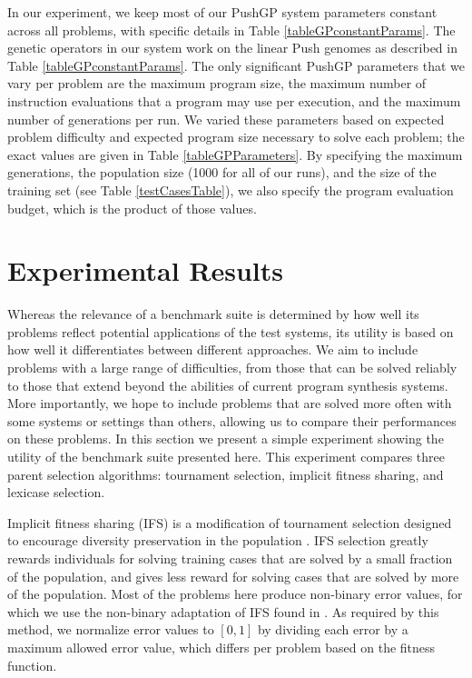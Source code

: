 \documentclass{sig-alternate}
\begin{document}
In our experiment, we keep most of our PushGP system parameters constant across all problems, with specific details in Table \ref{tableGPconstantParams}. The genetic operators in our system work on the linear Push genomes as described in Table \ref{tableGPconstantParams}.
The only significant PushGP parameters that we vary per problem are the maximum program size, the maximum number of instruction evaluations that a program may use per execution, and the maximum number of generations per run. We varied these parameters based on expected problem difficulty and expected program size necessary to solve each problem; the exact values are given in Table \ref{tableGPParameters}. By specifying the maximum generations, the population size (1000 for all of our runs), and the size of the training set (see Table \ref{testCasesTable}), we also specify the program evaluation budget, which is the product of those values.


\section{Experimental Results}

Whereas the relevance of a benchmark suite is determined by how well its problems reflect potential applications of the test systems, its utility is based on how well it differentiates between different approaches. We aim to include problems with a large range of difficulties, from those that can be solved reliably to those that extend beyond the abilities of current program synthesis systems. More importantly, we hope to include problems that are solved more often with some systems or settings than others, allowing us to compare their performances on these problems.
In this section we present a simple experiment showing the utility of the benchmark suite presented here. This experiment compares three parent selection algorithms: tournament selection, implicit fitness sharing, and lexicase selection.

Implicit fitness sharing (IFS) is a modification of tournament selection designed to encourage diversity preservation in the population \cite{McKay:2000:GECCO, Smith92populationdiversity}. IFS selection greatly rewards individuals for solving training cases that are solved by a small fraction of the population, and gives less reward for solving cases that are solved by more of the population. Most of the problems here produce non-binary error values, for which we use the non-binary adaptation of IFS found in \cite{Krawiec:2013:EvoIASP}. As required by this method, we normalize error values to $[0, 1]$ by dividing each error by a maximum allowed error value, which differs per problem based on the fitness function.
\end{document}
